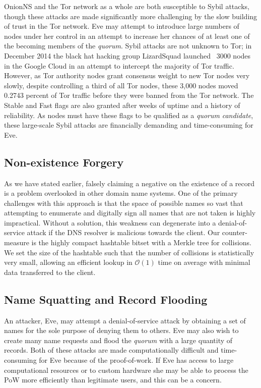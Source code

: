 OnionNS and the Tor network as a whole are both susceptible to Sybil attacks, though these attacks are made significantly more challenging by the slow building of trust in the Tor network. Eve may attempt to introduce large numbers of nodes under her control in an attempt to increase her chances of at least one of the becoming members of the \emph{quorum}. Sybil attacks are not unknown to Tor; in December 2014 the black hat hacking group LizardSquad launched ~3000 nodes in the Google Cloud in an attempt to intercept the majority of Tor traffic. However, as Tor authority nodes grant consensus weight to new Tor nodes very slowly, despite controlling a third of all Tor nodes, these 3,000 nodes moved 0.2743 percent of Tor traffic before they were banned from the Tor network. The Stable and Fast flags are also granted after weeks of uptime and a history of reliability. As nodes must have these flags to be qualified as a \emph{quorum} \emph{candidate}, these large-scale Sybil attacks are financially demanding and time-consuming for Eve.

\subsection{Non-existence Forgery}

As we have stated earlier, falsely claiming a negative on the existence of a record is a problem overlooked in other domain name systems. One of the primary challenges with this approach is that the space of possible names so vast that attempting to enumerate and digitally sign all names that are not taken is highly impractical. Without a solution, this weakness can degenerate into a denial-of-service attack if the DNS resolver is malicious towards the client. Our counter-measure is the highly compact hashtable bitset with a Merkle tree for collisions. We set the size of the hashtable such that the number of collisions is statistically very small, allowing an efficient lookup in $ \mathcal{O}(1) $ time on average with minimal data transferred to the client.

\subsection{Name Squatting and Record Flooding}

An attacker, Eve, may attempt a denial-of-service attack by obtaining a set of names for the sole purpose of denying them to others. Eve may also wish to create many name requests and flood the \emph{quorum} with a large quantity of records. Both of these attacks are made computationally difficult and time-consuming for Eve because of the proof-of-work. If Eve has access to large computational resources or to custom hardware she may be able to process the PoW more efficiently than legitimate users, and this can be a concern.

